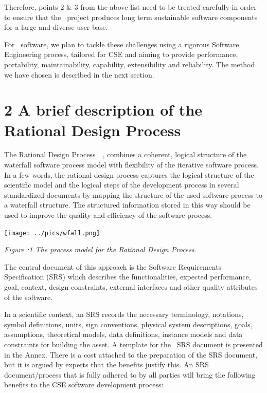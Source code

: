 \documentclass{article}
\begin{document}
Therefore, points 2 \& 3 from the above list need to be treated carefully in order 
to ensure that the \nep \   project produces long term sustainable software components 
for a large and diverse user base.

For \nep \   software, we plan to tackle these challenges using a rigorous Software 
Engineering process, tailored for CSE and aiming to provide performance, portability, 
maintainability, capability, extensibility and reliability. The method we have 
chosen is described in the next section.

\section*{{\Large{}{ \textbf{2 A brief description of the Rational 
Design Process}}}}

The Rational Design Process~\cite{ref [4]}~\cite{ref [5]}, combines a coherent, logical structure of 
the waterfall software process model with flexibility of the iterative software 
process. In a few words, the rational design process captures the logical structure 
of the scientific model and the logical steps of the development process in several 
standardized documents by mapping the structure of the used software process to 
a waterfall structure. The structured information stored in this way should be 
used to improve the quality and efficiency of the software process.

\begin{center}
\texttt{[image: ../pics/wfall.png]}

{ \textit{Figure :1 The process model for the Rational Design Process.}}
\end{center}

\baselineskip=18pt
The central document of this approach is the Software Requirements Specification 
(SRS) which describes the functionalities, expected performance, goal, context, 
design constraints, external interfaces and other quality attributes of the software.

In a scientific context, an SRS records the necessary terminology, notations, symbol 
definitions, units, sign conventions, physical system descriptions, goals, assumptions, 
theoretical models, data definitions, instance models and data constraints for 
building the asset. A template for the \nep \   SRS document is presented in the 
Annex. There is a cost attached to the preparation of the SRS document, but it 
is argued by experts that the benefits justify this. An SRS document/process that 
is fully adhered to by all parties will bring the following benefits to the CSE 
software development process: 
\end{document}
